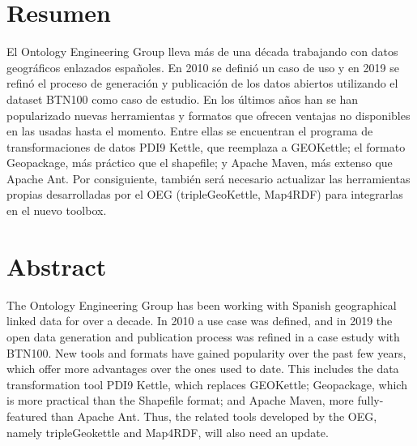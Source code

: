 \chapter*{Resumen}

El Ontology Engineering Group lleva más de una década trabajando con datos geográficos enlazados españoles. En
2010\cite{spanish} se definió un caso de uso y en 2019\cite{toolbox} se refinó el proceso de generación y
publicación de los datos abiertos utilizando el dataset BTN100 como caso de estudio. En los últimos años han se
han popularizado nuevas herramientas y formatos que ofrecen ventajas no disponibles en las usadas hasta el
momento. Entre ellas se encuentran el programa de transformaciones de datos PDI9 Kettle, que reemplaza a
GEOKettle; el formato Geopackage, más práctico que el shapefile; y Apache Maven, más extenso que Apache Ant. Por
consiguiente, también será necesario actualizar las herramientas propias desarrolladas por el OEG
(tripleGeoKettle, Map4RDF) para integrarlas en el nuevo toolbox. 

\newpage

\chapter*{Abstract}

The Ontology Engineering Group has been working with Spanish geographical linked data for over a decade. In
2010\cite{spanish} a use case was defined, and in 2019\cite{toolbox} the open data generation and publication
process was refined in a case estudy with BTN100. New tools and formats have gained popularity over the past few
years, which offer more advantages over the ones used to date. This includes the data transformation tool PDI9
Kettle, which replaces GEOKettle; Geopackage, which is more practical than the Shapefile format; and Apache
Maven, more fully-featured than Apache Ant. Thus, the related tools developed by the OEG, namely tripleGeokettle
and Map4RDF, will also need an update.


